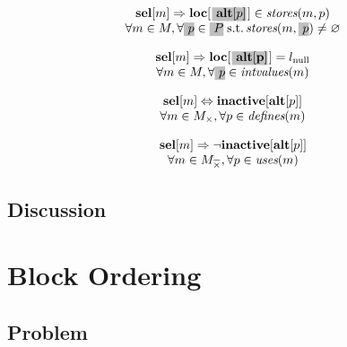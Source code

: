 \begin{equation}
  \begin{array}{c}
    \mVar{sel}[m]
    \mImp
    \mVar{loc}[\hlDiff{\mVar{alt}[p]}[1pt]] \in \mStores(m, p) \\
    \forall m \in \mMatchSet,
    \forall \hlDiff{p} \in
      \hlDiff{\mOperandSet} \;\text{s.t.}
      \mStores(m, \hlDiff{p}) \neq \mEmptySet
  \end{array}
  \labelEquation{valid-locations-alt}
\end{equation}

\begin{equation}
  \begin{array}{c}
    \mVar{sel}[m]
    \mImp
    \mVar{loc}[\hlDiff{\mVar{alt[p]}}[1pt]] = \mNullLocation \\
    \forall m \in \mMatchSet,
    \forall \hlDiff{p} \in \mIntValues(m)
  \end{array}
  \labelEquation{locs-of-intermediate-values-alt}
\end{equation}

\begin{equation}
  \begin{array}{c}
    \mVar{sel}[m]
    \mEq
    \mVar{inactive}[\mVar{alt}[p]] \\
    \forall m \in \mMatchSet[\mKill],
    \forall p \in \mDefines(m)
  \end{array}
  \labelEquation{inactivity-when-killed}
\end{equation}

\begin{equation}
  \begin{array}{c}
    \mVar{sel}[m]
    \mImp
    \neg \mVar{inactive}[\mVar{alt}[p]] \\
    \forall m \in \mMatchCompSet{\mKill},
    \forall p \in \mUses(m)
  \end{array}
  \labelEquation{inactivity-when-used}
\end{equation}

\subsection{Discussion}

\section{Block Ordering}
\subsection{Problem}
